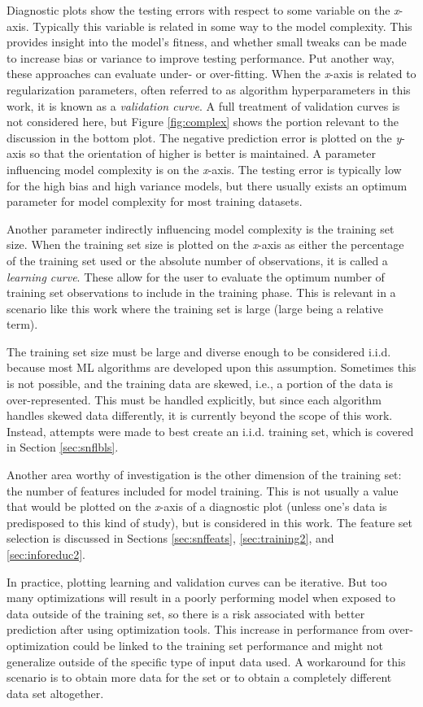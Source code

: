 Diagnostic plots show the testing errors with respect to some variable on the
\textit{x}-axis.  Typically this variable is related in some way to the model
complexity. This provides insight into the model's fitness, and whether small
tweaks can be made to increase bias or variance to improve testing performance.
Put another way, these approaches can evaluate under- or over-fitting.  When
the \textit{x}-axis is related to regularization parameters, often referred to
as algorithm hyperparameters in this work, it is known as a \textit{validation
curve}. A full treatment of validation curves is not considered here, but
Figure \ref{fig:complex} shows the portion relevant to the discussion in the
bottom plot.  The negative prediction error is plotted on the \textit{y}-axis
so that the orientation of higher is better is maintained.  A parameter
influencing model complexity is on the \textit{x}-axis.  The testing error is
typically low for the high bias and high variance models, but there usually
exists an optimum parameter for model complexity for most training datasets. 

Another parameter indirectly influencing model complexity is the training set
size.  When the training set size is plotted on the \textit{x}-axis as either
the percentage of the training set used or the absolute number of observations,
it is called a \textit{learning curve}.  These allow for the user to evaluate
the optimum number of training set observations to include in the training
phase.  This is relevant in a scenario like this work where the training set is
large (large being a relative term).  

The training set size must be large and diverse enough to be considered
\gls{i.i.d.} because most \gls{ML} algorithms are developed upon this
assumption. Sometimes this is not possible, and the training data are skewed,
i.e., a portion of the data is over-represented. This must be handled
explicitly, but since each algorithm handles skewed data differently, it is
currently beyond the scope of this work. Instead, attempts were made to best
create an \gls{i.i.d.} training set, which is covered in Section
\ref{sec:snflbls}.

Another area worthy of investigation is the other dimension of the training
set: the number of features included for model training. This is not usually a
value that would be plotted on the \textit{x}-axis of a diagnostic plot (unless
one's data is predisposed to this kind of study), but is considered in this
work. The feature set selection is discussed in Sections \ref{sec:snffeats},
\ref{sec:training2}, and \ref{sec:inforeduc2}.

In practice, plotting learning and validation curves can be iterative. But too
many optimizations will result in a poorly performing model when exposed to
data outside of the training set, so there is a risk associated with better
prediction after using optimization tools.  This increase in performance from
over-optimization could be linked to the training set performance and might not
generalize outside of the specific type of input data used.  A workaround for
this scenario is to obtain more data for the set or to obtain a completely
different data set altogether. 

